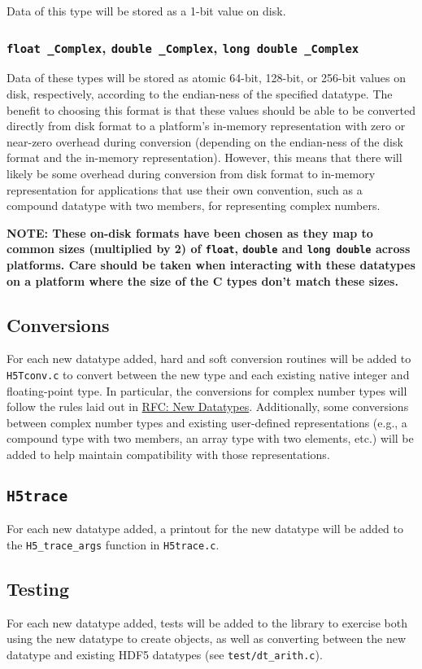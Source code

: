 \documentclass[../HDF5_RFC.tex]{subfiles}
\begin{document}
Data of this type will be stored as a 1-bit value on disk.

\subsubsection{\texttt{float \_Complex}, \texttt{double \_Complex}, \texttt{long double \_Complex}}

Data of these types will be stored as atomic 64-bit, 128-bit, or 256-bit values on disk, respectively,
according to the endian-ness of the specified datatype. The benefit to choosing this format is that
these values should be able to be converted directly from disk format to a platform's in-memory
representation with zero or near-zero overhead during conversion (depending on the endian-ness of the disk
format and the in-memory representation). However, this means that there will likely be some overhead during
conversion from disk format to in-memory representation for applications that use their own convention, such
as a compound datatype with two members, for representing complex numbers.

\textbf{NOTE: These on-disk formats have been chosen as they map to common sizes (multiplied by 2) of \texttt{float},
\texttt{double} and \texttt{long double} across platforms. Care should be taken when interacting with these
datatypes on a platform where the size of the C types don't match these sizes.}

\subsection{Conversions}

For each new datatype added, hard and soft conversion routines will be added to \texttt{H5Tconv.c} to
convert between the new type and each existing native integer and floating-point type. In particular,
the conversions for complex number types will follow the rules laid out in
\href{https://github.com/HDFGroup/hdf5doc/blob/master/RFCs/HDF5_Library/New_Datatypes/new_datatypes.pdf}{RFC: New Datatypes}.
Additionally, some conversions between complex number types and existing user-defined representations
(e.g., a compound type with two members, an array type with two elements, etc.) will be added to help
maintain compatibility with those representations.

\subsection{\texttt{H5trace}}

For each new datatype added, a printout for the new datatype will be added to the \texttt{H5\_trace\_args}
function in \texttt{H5trace.c}.

\subsection{Testing}

For each new datatype added, tests will be added to the library to exercise both using the new datatype
to create objects, as well as converting between the new datatype and existing HDF5 datatypes
(see \texttt{test/dt\_arith.c}).
\end{document}

